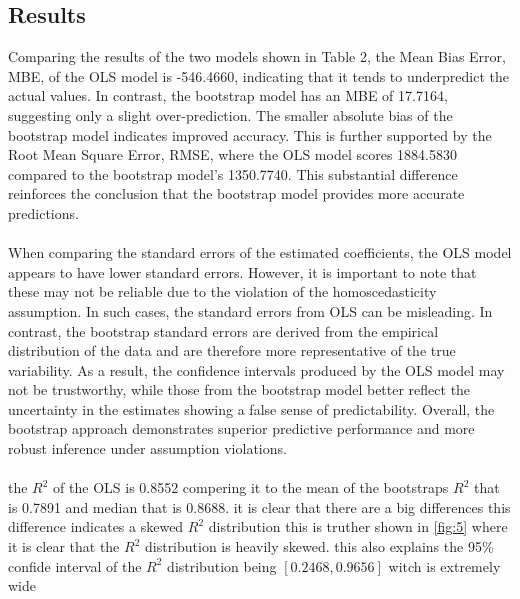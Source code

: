 \subsection{Results}
Comparing the results of the two models shown in Table 2, the Mean Bias Error, MBE, of the OLS model is -546.4660, indicating that it tends to underpredict the actual values. In contrast, the bootstrap model has an MBE of 17.7164, suggesting only a slight over-prediction. The smaller absolute bias of the bootstrap model indicates improved accuracy. This is further supported by the Root Mean Square Error, RMSE, where the OLS model scores 1884.5830 compared to the bootstrap model’s 1350.7740. This substantial difference reinforces the conclusion that the bootstrap model provides more accurate predictions.
\\\\
When comparing the standard errors of the estimated coefficients, the OLS model appears to have lower standard errors. However, it is important to note that these may not be reliable due to the violation of the homoscedasticity assumption. In such cases, the standard errors from OLS can be misleading. In contrast, the bootstrap standard errors are derived from the empirical distribution of the data and are therefore more representative of the true variability. As a result, the confidence intervals produced by the OLS model may not be trustworthy, while those from the bootstrap model better reflect the uncertainty in the estimates showing a false sense of predictability. Overall, the bootstrap approach demonstrates superior predictive performance and more robust inference under assumption violations.
\\\\
the $R^2$ of the OLS is 0.8552 compering it to the mean of the bootstraps $R^2$ that is 0.7891 and median that is 0.8688. it is clear that there are a big differences this difference indicates a skewed  $R^2$ distribution this is truther shown in \autoref{fig:5} where it is clear that the $R^2$ distribution is heavily skewed. this also explains the 95\% confide interval of the  $R^2$ distribution being $[ 0.2468 ,  0.9656 ] $ witch is extremely wide


